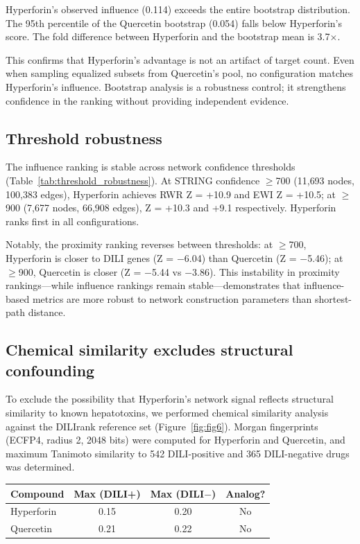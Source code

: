 Hyperforin's observed influence (0.114) exceeds the entire bootstrap distribution.
The 95th percentile of the Quercetin bootstrap (0.054) falls below Hyperforin's score.
The fold difference between Hyperforin and the bootstrap mean is 3.7$\times$.

This confirms that Hyperforin's advantage is not an artifact of target count.
Even when sampling equalized subsets from Quercetin's pool, no configuration matches Hyperforin's influence.
Bootstrap analysis is a robustness control; it strengthens confidence in the ranking without providing independent evidence.

\subsection{Threshold robustness}
\label{sec:threshold}

The influence ranking is stable across network confidence thresholds (Table~\ref{tab:threshold_robustness}).
At STRING confidence $\geq$700 (11{,}693 nodes, 100{,}383 edges), Hyperforin achieves RWR Z = +10.9 and EWI Z = +10.5; at $\geq$900 (7{,}677 nodes, 66{,}908 edges), Z = +10.3 and +9.1 respectively.
Hyperforin ranks first in all configurations.

Notably, the proximity ranking reverses between thresholds: at $\geq$700, Hyperforin is closer to DILI genes (Z = $-$6.04) than Quercetin (Z = $-$5.46); at $\geq$900, Quercetin is closer (Z = $-$5.44 vs $-$3.86).
This instability in proximity rankings---while influence rankings remain stable---demonstrates that influence-based metrics are more robust to network construction parameters than shortest-path distance.

\subsection{Chemical similarity excludes structural confounding}

To exclude the possibility that Hyperforin's network signal reflects structural similarity to known hepatotoxins, we performed chemical similarity analysis against the DILIrank reference set \citep{Chen2016} (Figure~\ref{fig:fig6}).
Morgan fingerprints (ECFP4, radius 2, 2048 bits) were computed for Hyperforin and Quercetin, and maximum Tanimoto similarity to 542 DILI-positive and 365 DILI-negative drugs was determined.

\begin{center}
\begin{tabular}{lccc}
\toprule
\textbf{Compound} & \textbf{Max (DILI+)} & \textbf{Max (DILI$-$)} & \textbf{Analog?} \\
\midrule
Hyperforin & 0.15 & 0.20 & No \\
Quercetin & 0.21 & 0.22 & No \\
\bottomrule
\end{tabular}
\end{center}

